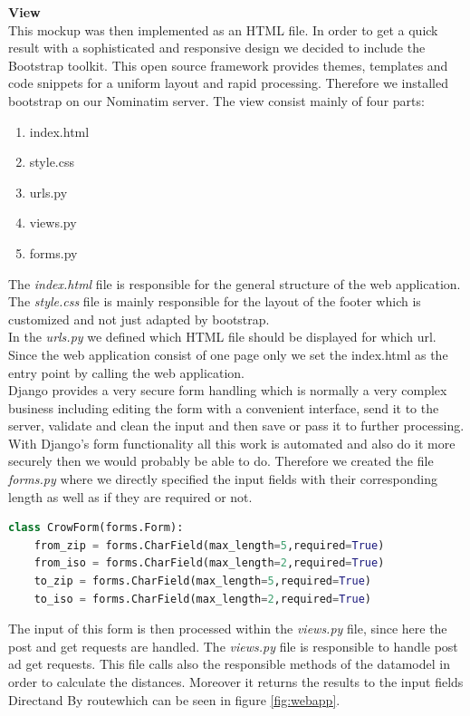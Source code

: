 \textbf{View}\\
This mockup was then implemented as an HTML file. In order to get a quick result with a sophisticated and responsive design we decided to include the Bootstrap toolkit. This open source framework provides themes, templates and code snippets for a uniform layout and rapid processing. Therefore we installed bootstrap on our Nominatim server. 
The view consist mainly of four parts:
\begin{enumerate}
\item index.html
\item style.css
\item urls.py
\item views.py
\item forms.py
\end{enumerate}
The \emph{index.html} file is responsible for the general structure of the web application. The \emph{style.css} file is mainly responsible for the layout of the footer which is customized and not just adapted by bootstrap. \\
In the \emph{urls.py} we defined which HTML file should be displayed for which url. Since the web application consist of one page only we set the index.html as the entry point by calling the web application. \\
Django provides a very secure form handling which is normally a very complex business including editing the form with a convenient interface, send it to the server, validate and clean the input and then save or pass it to further processing. With Django's form functionality all this work is automated and also do it more securely then we would probably be able to do.
Therefore we created the file \emph{forms.py} where we directly specified the input fields with their corresponding length as well as if they are required or not.
\begin{lstlisting}[language=python,breaklines=true]
class CrowForm(forms.Form):
    from_zip = forms.CharField(max_length=5,required=True)
    from_iso = forms.CharField(max_length=2,required=True)
    to_zip = forms.CharField(max_length=5,required=True)
    to_iso = forms.CharField(max_length=2,required=True)
    \end{lstlisting}
The input of this form is then processed within the \emph{views.py} file, since here the post and get requests are handled.
The \emph{views.py} file is responsible to handle post ad get requests.
This file calls also the responsible methods of the datamodel in order to calculate the distances. 
Moreover it returns the results to the input fields \glqq Direct\grqq and \glqq By route\grqq which can be seen in figure \ref{fig:webapp}.
